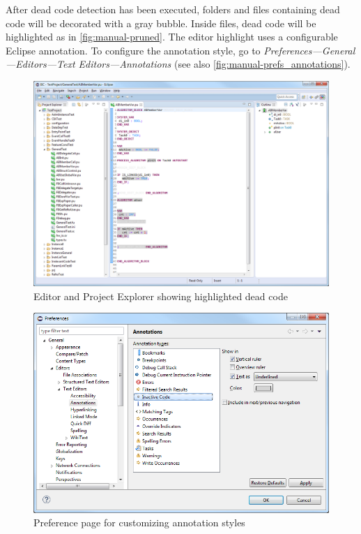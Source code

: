 After dead code detection has been executed, folders and files containing dead code will be decorated with a gray 
bubble. Inside files, dead code will be highlighted as in \autoref{fig:manual-pruned}. The editor highlight uses a 
configurable Eclipse annotation. To configure the annotation style, go to \emph{Preferences---General---Editors---Text 
Editors---Annotations} (see also \autoref{fig:manual-prefs_annotations}).

\begin{figure}[htp]
  \centering
    \includegraphics[width=\textwidth]{bilder/manual-pruned}
  \caption{Editor and Project Explorer showing highlighted dead code}
  \label{fig:manual-pruned}
\end{figure}

\begin{figure}[htp]
  \centering
    \includegraphics[width=\textwidth]{bilder/manual-prefs_annotations}
  \caption{Preference page for customizing annotation styles}
  \label{fig:manual-prefs_annotations}
\end{figure}

